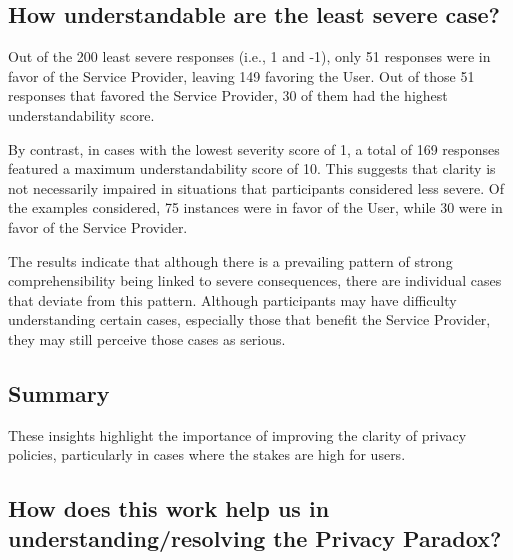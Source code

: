 \subsection{How understandable are the least severe case?}
\label{sec:leastSevere}

Out of the 200 least severe responses (i.e., 1 and -1), only 51 responses were in favor of the Service Provider, leaving 149 favoring the User.
Out of those 51 responses that favored the Service Provider, 30 of them had the highest understandability score.

By contrast, in cases with the lowest severity score of 1, a total of 169 responses featured a maximum understandability score of 10.
This suggests that clarity is not necessarily impaired in situations that participants considered less severe.
Of the examples considered, 75 instances were in favor of the User, while 30 were in favor of the Service Provider.

The results indicate that although there is a prevailing pattern of strong comprehensibility being linked to severe consequences, there are individual cases that deviate from this pattern.
Although participants may have difficulty understanding certain cases, especially those that benefit the Service Provider, they may still perceive those cases as serious.

\subsection{Summary}

These insights highlight the importance of improving the clarity of privacy policies, particularly in cases where the stakes are high for users.







\subsection{How does this work help us in understanding/resolving the Privacy Paradox?}

